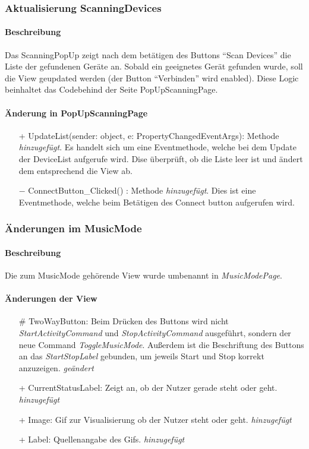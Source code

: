 \documentclass[a4paper,12pt]{article}
\begin{document}
\subsubsection{Aktualisierung ScanningDevices}
\paragraph{Beschreibung}
Das ScanningPopUp zeigt nach dem betätigen des Buttons ``Scan Devices'' die Liste der gefundenen Geräte an. Sobald ein geeignetes Gerät gefunden wurde, soll die View geupdated werden (der Button ``Verbinden'' wird enabled). Diese Logic beinhaltet das Codebehind der Seite PopUpScanningPage.

\paragraph{Änderung in PopUpScanningPage}
\begin{itemize}
	\item[+] UpdateList(sender: object, e: PropertyChangedEventArgs): Methode \textit{hinzugefügt}. Es handelt sich um eine Eventmethode, welche bei dem Update der DeviceList aufgerufe wird. Dise überprüft, ob die Liste leer ist und ändert dem entsprechend die View ab.
	\item[$-$] ConnectButton\_Clicked() : Methode \textit{hinzugefügt}. Dies ist eine Eventmethode, welche beim Betätigen des Connect button aufgerufen wird.
\end{itemize} 

\subsubsection{Änderungen im MusicMode}
\paragraph{Beschreibung}
Die zum MusicMode gehörende View wurde umbenannt in \textit{MusicModePage}.

\paragraph{Änderungen der View}
\begin{itemize}
	\item[\#] TwoWayButton: Beim Drücken des Buttons wird nicht
			\textit{StartActivityCommand} und \textit{StopActivityCommand}
			ausgeführt, sondern der neue Command \textit{ToggleMusicMode}.
			Außerdem ist die Beschriftung des Buttons an das \textit{StartStopLabel}
			gebunden, um jeweils \glqq{}Start\grqq{} und \glqq{}Stop\grqq{} korrekt anzuzeigen. \textit{geändert}
	\item[+] CurrentStatusLabel: Zeigt an, ob der Nutzer gerade steht oder geht. \textit{hinzugefügt}
	\item[+] Image: Gif zur Visualisierung ob der Nutzer steht oder geht. \textit{hinzugefügt}
	\item[+] Label: Quellenangabe des Gifs. \textit{hinzugefügt}
\end{itemize}
\end{document}
